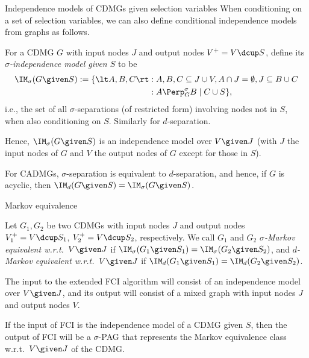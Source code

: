 \begin{frame}{Independence models of CDMGs given selection variables}
When conditioning on a set of selection variables, we can also define conditional independence models from graphs as follows.
\begin{Def}[\ref{def:conditional_independence_model_graph}]
  For a CDMG $G$ with input nodes $J$ and output nodes $V^+ = V \dcup S$, define its \emph{$\sigma$-independence model given $S$} to be
  \begin{equation*}\begin{split}
    \IM_\sigma(G \given S) := \{ \lt A, B, C \rt & : A, B, C \subseteq J \cup V, A \cap J = \emptyset, J \subseteq B \cup C \\
                                                 & : A \Perp_G^\sigma B \mid C \cup S \},
  \end{split}\end{equation*}
  i.e., the set of all $\sigma$-separations (of restricted form) involving nodes not in $S$, when also conditioning on $S$. 
  Similarly for $d$-separation.
\end{Def}
Hence, $\IM_\sigma(G \given S)$ is an independence model over $V \given J$ (with $J$ the input nodes of $G$ and $V$ the output nodes of $G$ except for those in $S$).

For CADMGs, $\sigma$-separation is equivalent to $d$-separation, and hence, if $G$ is acyclic, then $\IM_d(G \given S) = \IM_\sigma(G \given S)$.
\end{frame}

\begin{frame}{Markov equivalence}
\begin{Def}[\ref{def:Markov_equivalent}]
  Let $G_1, G_2$ be two CDMGs with input nodes $J$ and output nodes $V_1^+ = V \dcup S_1$, $V_2^+ = V \dcup S_2$, respectively.
  We call $G_1$ and $G_2$ \emph{$\sigma$-Markov equivalent w.r.t.\ $V \given J$} if $\IM_\sigma(G_1 \given S_1) = \IM_\sigma(G_2 \given S_2)$, and \emph{$d$-Markov equivalent w.r.t.\ $V \given J$} if $\IM_d(G_1 \given S_1) = \IM_d(G_2 \given S_2)$.
\end{Def}

\bigskip
The input to the extended FCI algorithm will consist of an independence model over $V \given J$, and its output will consist of a mixed graph with input nodes $J$ and output nodes $V$.

\bigskip
If the input of FCI is the independence model of a CDMG given $S$, then the output of FCI will be a $\sigma$-PAG that represents the Markov equivalence class w.r.t.\ $V \given J$ of the CDMG.
\end{frame}

